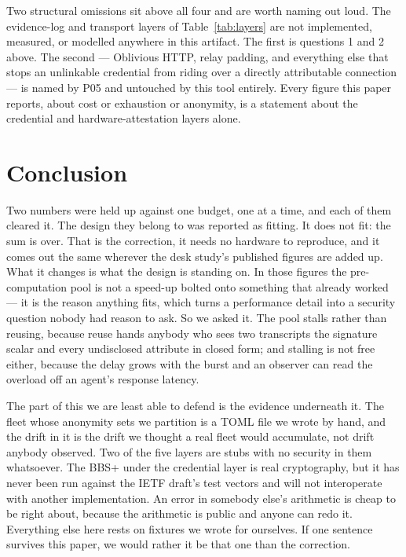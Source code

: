 \documentclass[11pt]{article}
\begin{document}
\begin{enumerate}[itemsep=3pt,topsep=3pt]
\end{enumerate}

Two structural omissions sit above all four and are worth naming out loud.
The evidence-log and transport layers of Table~\ref{tab:layers} are not
implemented, measured, or modelled anywhere in this artifact. The first is
questions 1 and 2 above. The second --- Oblivious HTTP, relay padding, and
everything else that stops an unlinkable credential from riding over a
directly attributable connection --- is named by P05 and untouched by this
tool entirely. Every figure this paper reports, about cost or exhaustion or
anonymity, is a statement about the credential and hardware-attestation
layers alone.

\section{Conclusion}

Two numbers were held up against one budget, one at a time, and each of them
cleared it. The design they belong to was reported as fitting. It does not
fit: the sum is over. That is the correction, it needs no hardware to
reproduce, and it comes out the same wherever the desk study's published
figures are added up. What it changes is what the design is standing on. In
those figures the pre-computation pool is not a speed-up bolted onto
something that already worked --- it is the reason anything fits, which turns
a performance detail into a security question nobody had reason to ask. So we
asked it. The pool stalls rather than reusing, because reuse hands anybody
who sees two transcripts the signature scalar and every undisclosed attribute
in closed form; and stalling is not free either, because the delay grows with
the burst and an observer can read the overload off an agent's response
latency.

The part of this we are least able to defend is the evidence underneath it.
The fleet whose anonymity sets we partition is a TOML file we wrote by hand,
and the drift in it is the drift we thought a real fleet would accumulate,
not drift anybody observed. Two of the five layers are stubs with no security
in them whatsoever. The BBS+ under the credential layer is real cryptography,
but it has never been run against the IETF draft's test vectors and will not
interoperate with another implementation. An error in somebody else's
arithmetic is cheap to be right about, because the arithmetic is public and
anyone can redo it. Everything else here rests on fixtures we wrote for
ourselves. If one sentence survives this paper, we would rather it be that
one than the correction.



\end{document}
